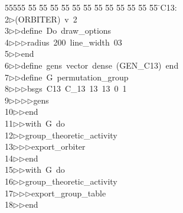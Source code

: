 %
%
\begin{tabbing}
55555 \= 55 \= 55 \= 55 \= 55 \= 55 \= 55 \= 55 \= 55 \= 55 \= 55 \= 55 \= 55 \= \>C13:\\[0pt]
2\>$\triangleright$\>(ORBITER)\ v\ 2\ \\[0pt]
3\>$\triangleright$\>$\triangleright$\>define\ Do\ draw\_options\ \\[0pt]
4\>$\triangleright$\>$\triangleright$\>$\triangleright$\>radius\ 200\ line\_width\ 03\ \\[0pt]
5\>$\triangleright$\>$\triangleright$\>end\ \\[0pt]
6\>$\triangleright$\>$\triangleright$\>define\ gens\ vector\ dense\ (GEN\_C13)\ end\ \\[0pt]
7\>$\triangleright$\>$\triangleright$\>define\ G\ permutation\_group\ \\[0pt]
8\>$\triangleright$\>$\triangleright$\>$\triangleright$\>bsgs\ C13\ C\_13\ 13\ 13\ 0\ 1\ \\[0pt]
9\>$\triangleright$\>$\triangleright$\>$\triangleright$\>$\triangleright$\>gens\ \\[0pt]
10\>$\triangleright$\>$\triangleright$\>end\ \\[0pt]
11\>$\triangleright$\>$\triangleright$\>with\ G\ do\ \\[0pt]
12\>$\triangleright$\>$\triangleright$\>group\_theoretic\_activity\ \\[0pt]
13\>$\triangleright$\>$\triangleright$\>$\triangleright$\>export\_orbiter\ \\[0pt]
14\>$\triangleright$\>$\triangleright$\>end\ \\[0pt]
15\>$\triangleright$\>$\triangleright$\>with\ G\ do\ \\[0pt]
16\>$\triangleright$\>$\triangleright$\>group\_theoretic\_activity\ \\[0pt]
17\>$\triangleright$\>$\triangleright$\>$\triangleright$\>export\_group\_table\ \\[0pt]
18\>$\triangleright$\>$\triangleright$\>end\ \\[0pt]

\end{tabbing}
